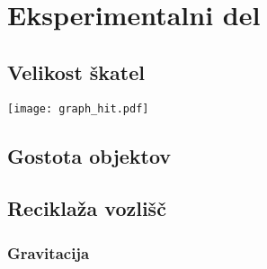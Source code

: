 \documentclass[a4paper,12pt]{article}
\begin{document}
\newpage
\section{Eksperimentalni del}

\subsection{Velikost škatel}
\texttt{[image: graph\_hit.pdf]}

\subsection{Gostota objektov}

\subsection{Reciklaža vozlišč}
\subsubsection{Gravitacija}
\newpage
\lstlistoflistings{}


\end{document}
